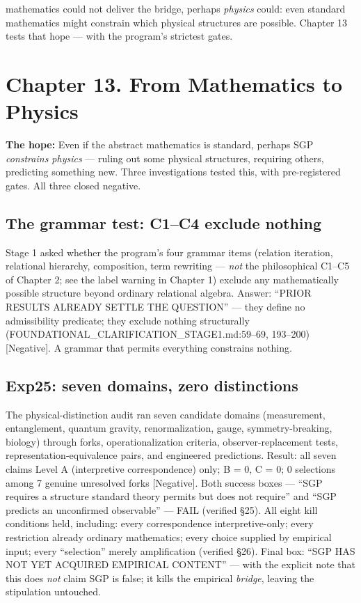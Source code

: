 \documentclass[
  11pt,
]{book}
\begin{document}
mathematics could not deliver the bridge, perhaps \emph{physics} could:
even standard mathematics might constrain which physical structures are
possible. Chapter 13 tests that hope --- with the program's strictest
gates.

\newpage

\chapter{Chapter 13. From Mathematics to
Physics}\label{chapter-13.-from-mathematics-to-physics}

\textbf{The hope:} Even if the abstract mathematics is standard, perhaps
SGP \emph{constrains physics} --- ruling out some physical structures,
requiring others, predicting something new. Three investigations tested
this, with pre-registered gates. All three closed negative.

\section{The grammar test: C1--C4 exclude
nothing}\label{the-grammar-test-c1c4-exclude-nothing}

Stage 1 asked whether the program's four grammar items (relation
iteration, relational hierarchy, composition, term rewriting ---
\emph{not} the philosophical C1--C5 of Chapter 2; see the label warning
in Chapter 1) exclude any mathematically possible structure beyond
ordinary relational algebra. Answer: ``PRIOR RESULTS ALREADY SETTLE THE
QUESTION'' --- they define no admissibility predicate; they exclude
nothing structurally (FOUNDATIONAL\_CLARIFICATION\_STAGE1.md:59--69,
193--200) {[}Negative{]}. A grammar that permits everything constrains
nothing.

\section{Exp25: seven domains, zero
distinctions}\label{exp25-seven-domains-zero-distinctions}

The physical-distinction audit ran seven candidate domains (measurement,
entanglement, quantum gravity, renormalization, gauge,
symmetry-breaking, biology) through forks, operationalization criteria,
observer-replacement tests, representation-equivalence pairs, and
engineered predictions. Result: all seven claims Level A (interpretive
correspondence) only; B = 0, C = 0; 0 selections among 7 genuine
unresolved forks {[}Negative{]}. Both success boxes --- ``SGP requires a
structure standard theory permits but does not require'' and ``SGP
predicts an unconfirmed observable'' --- FAIL (verified §25). All eight
kill conditions held, including: every correspondence interpretive-only;
every restriction already ordinary mathematics; every choice supplied by
empirical input; every ``selection'' merely amplification (verified
§26). Final box: ``SGP HAS NOT YET ACQUIRED EMPIRICAL CONTENT'' --- with
the explicit note that this does \emph{not} claim SGP is false; it kills
the empirical \emph{bridge}, leaving the stipulation untouched.
\end{document}
